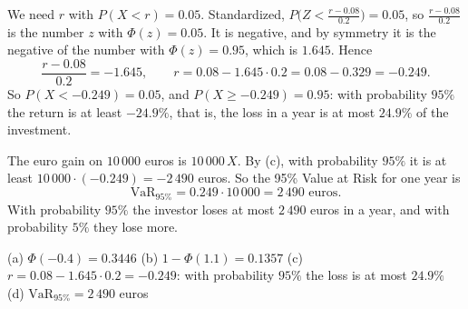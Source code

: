 \begin{solution}
	 We need $r$ with $P(X<r)=0.05$. Standardized,
	$P\bigl(Z<\frac{r-0.08}{0.2}\bigr)=0.05$, so $\frac{r-0.08}{0.2}$ is the
	number $z$ with $\Phi(z)=0.05$. It is negative, and by symmetry it is the
	negative of the number with $\Phi(z)=0.95$, which is $1.645$. Hence
	\[ \frac{r-0.08}{0.2}=-1.645,\qquad r=0.08-1.645\cdot0.2=0.08-0.329=-0.249. \]
	So $P(X<-0.249)=0.05$, and $P(X\ge-0.249)=0.95$: with probability $95\%$
	the return is at least $-24.9\%$, that is, the loss in a year is at most
	$24.9\%$ of the investment.

	 The euro gain on $10\,000$ euros is $10\,000\,X$. By (c), with
	probability $95\%$ it is at least $10\,000\cdot(-0.249)=-2\,490$ euros. So
	the 95\% Value at Risk for one year is
	\[ \text{VaR}_{95\%}=0.249\cdot10\,000=2\,490\text{ euros}. \]
	With probability $95\%$ the investor loses at most $2\,490$ euros in a
	year, and with probability $5\%$ they lose more.

	\begin{answer}
		(a) $\Phi(-0.4)=0.3446$ \quad
		(b) $1-\Phi(1.1)=0.1357$ \quad
		(c) $r=0.08-1.645\cdot0.2=-0.249$: with probability $95\%$ the loss
		is at most $24.9\%$ \quad
		(d) $\text{VaR}_{95\%}=2\,490$ euros
	\end{answer}
\end{solution}
